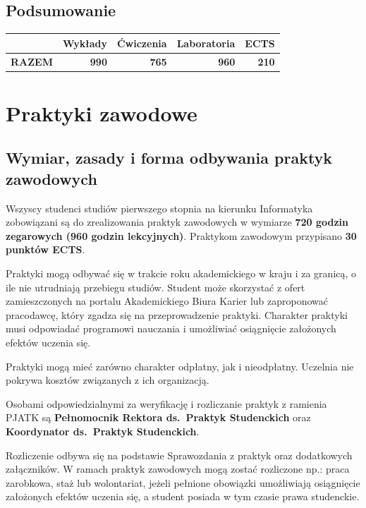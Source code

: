 \documentclass[12pt,a4paper]{article}
\begin{document}
\subsection*{Podsumowanie}

\begin{tabular}{lrrrr}
\toprule
\rowcolor{pjatkRed} {\color{white}} & {\color{white}\textbf{Wykłady}} & {\color{white}\textbf{Ćwiczenia}} & {\color{white}\textbf{Laboratoria}} & {\color{white}\textbf{ECTS}} \\
\midrule
\textbf{RAZEM} & \textbf{990} & \textbf{765} & \textbf{960} & \textbf{210} \\
\bottomrule
\end{tabular}



\newpage

\section{Praktyki zawodowe}

\subsection*{Wymiar, zasady i forma odbywania praktyk zawodowych}

Wszyscy studenci studiów pierwszego stopnia na kierunku Informatyka zobowiązani są do zrealizowania praktyk zawodowych w wymiarze \textbf{720 godzin zegarowych (960 godzin lekcyjnych)}. Praktykom zawodowym przypisano \textbf{30 punktów ECTS}.

Praktyki mogą odbywać się w trakcie roku akademickiego w kraju i za granicą, o ile nie utrudniają przebiegu studiów. Student może skorzystać z ofert zamieszczonych na portalu Akademickiego Biura Karier lub zaproponować pracodawcę, który zgadza się na przeprowadzenie praktyki. Charakter praktyki musi odpowiadać programowi nauczania i umożliwiać osiągnięcie założonych efektów uczenia się.

Praktyki mogą mieć zarówno charakter odpłatny, jak i nieodpłatny. Uczelnia nie pokrywa kosztów związanych z ich organizacją.

Osobami odpowiedzialnymi za weryfikację i rozliczanie praktyk z ramienia PJATK są \textbf{Pełnomocnik Rektora ds.~Praktyk Studenckich} oraz \textbf{Koordynator ds.~Praktyk Studenckich}.

Rozliczenie odbywa się na podstawie Sprawozdania z praktyk oraz dodatkowych załączników. W ramach praktyk zawodowych mogą zostać rozliczone np.: praca zarobkowa, staż lub wolontariat, jeżeli pełnione obowiązki umożliwiają osiągnięcie założonych efektów uczenia się, a student posiada w tym czasie prawa studenckie.
\end{document}
